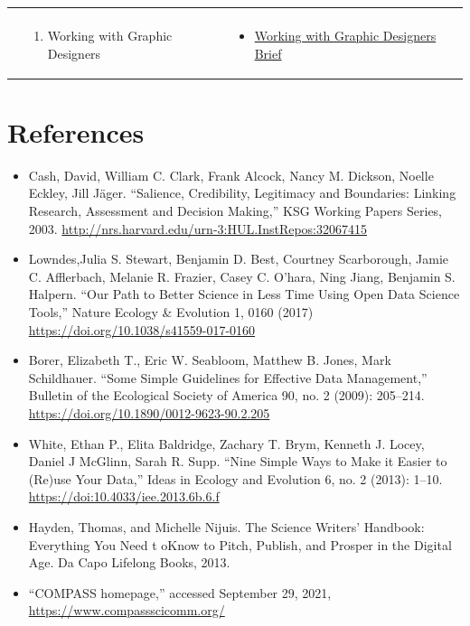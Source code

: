 \documentclass[
]{book}
\providecommand{\tightlist}{%
  \setlength{\itemsep}{0pt}\setlength{\parskip}{0pt}}
\begin{document}
\begin{longtable}[]{@{}lll@{}}
\begin{minipage}[t]{0.42\columnwidth}
\end{minipage}\tabularnewline
\begin{minipage}[t]{0.15\columnwidth}\raggedright
\strut
\end{minipage} & \begin{minipage}[t]{0.34\columnwidth}\raggedright
\begin{enumerate}
\def\labelenumi{\arabic{enumi}.}
\setcounter{enumi}{2}
\tightlist
\item
  Working with Graphic Designers
\end{enumerate}\strut
\end{minipage} & \begin{minipage}[t]{0.42\columnwidth}\raggedright
\begin{itemize}
\tightlist
\item
  \href{files/M4S3_Working_With_Graphic_Designers_Brief.pdf}{Working with Graphic Designers Brief}
\end{itemize}\strut
\end{minipage}\tabularnewline
\bottomrule
\end{longtable}

\hypertarget{references}{%
\section{References}\label{references}}

\begin{itemize}
\tightlist
\item
  Cash, David, William C. Clark, Frank Alcock, Nancy M. Dickson, Noelle Eckley, Jill Jäger. ``Salience, Credibility, Legitimacy and Boundaries: Linking Research, Assessment and Decision Making,'' KSG Working Papers Series, 2003. \url{http://nrs.harvard.edu/urn-3:HUL.InstRepos:32067415}
\item
  Lowndes,Julia S. Stewart, Benjamin D. Best, Courtney Scarborough, Jamie C. Afflerbach, Melanie R. Frazier, Casey C. O'hara, Ning Jiang, Benjamin S. Halpern. ``Our Path to Better Science in Less Time Using Open Data Science Tools,'' Nature Ecology \& Evolution 1, 0160 (2017) \url{https://doi.org/10.1038/s41559-017-0160}
\item
  Borer, Elizabeth T., Eric W. Seabloom, Matthew B. Jones, Mark Schildhauer. ``Some Simple Guidelines for Effective Data Management,'' Bulletin of the Ecological Society of America 90, no. 2 (2009): 205--214. \url{https://doi.org/10.1890/0012-9623-90.2.205}
\item
  White, Ethan P., Elita Baldridge, Zachary T. Brym, Kenneth J. Locey, Daniel J McGlinn, Sarah R. Supp. ``Nine Simple Ways to Make it Easier to (Re)use Your Data,'' Ideas in Ecology and Evolution 6, no. 2 (2013): 1--10. \url{https://doi:10.4033/iee.2013.6b.6.f}
\item
  Hayden, Thomas, and Michelle Nijuis. The Science Writers' Handbook: Everything You Need t oKnow to Pitch, Publish, and Prosper in the Digital Age. Da Capo Lifelong Books, 2013.
\item
  ``COMPASS homepage,'' accessed September 29, 2021, \url{https://www.compassscicomm.org/}
\end{itemize}
\end{document}
